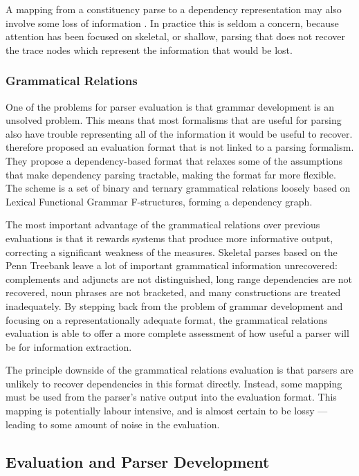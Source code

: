 A mapping from a constituency parse to a dependency representation may also involve some loss of information \citep{atwell96}. In practice this is seldom a concern, because attention has been focused on skeletal, or shallow, parsing that does not recover the trace nodes which represent the information that would be lost.

\subsubsection{Grammatical Relations}

One of the problems for parser evaluation is that grammar development is an unsolved problem. This means that most formalisms that are useful for parsing also have trouble representing all of the information it would be useful to recover. \citet{briscoe02} therefore proposed an evaluation format that is not linked to a parsing formalism. They propose a dependency-based format that relaxes some of the assumptions that make dependency parsing tractable, making the format far more flexible. The scheme is a set of binary and ternary grammatical relations loosely based on Lexical Functional Grammar F-structures, forming a dependency graph.

The most important advantage of the \citeauthor{briscoe98} grammatical relations over previous evaluations is that it rewards systems that produce more informative output, correcting a significant weakness of the \parseval measures. Skeletal parses based on the Penn Treebank leave a lot of important grammatical information unrecovered: complements and adjuncts are not distinguished, long range dependencies are not recovered, noun phrases are not bracketed, and many constructions are treated inadequately. By stepping back from the problem of grammar development and focusing on a representationally adequate format, the grammatical relations evaluation is able to offer a more complete assessment of how useful a parser will be for information extraction.

The principle downside of the grammatical relations evaluation is that parsers are unlikely to recover dependencies in this format directly. Instead, some mapping must be used from the parser's native output into the evaluation format. This mapping is potentially labour intensive, and is almost certain to be lossy --- leading to some amount of noise in the evaluation.

\subsection{Evaluation and Parser Development}

